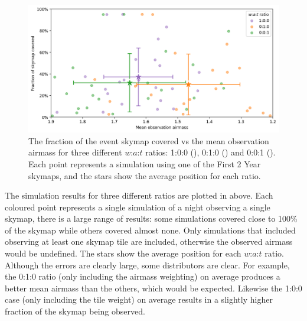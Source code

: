 \begin{colsection}
\begin{colsection}
\begin{figure}[t]
    \begin{center}
        \includegraphics[width=\linewidth]{images/sched_sim1.png}
    \end{center}
    \caption[Skymap coverage vs mean airmass for different $w$:$a$:$t$ ratios]{
        The fraction of the event skymap covered vs the mean observation airmass for three different $w$:$a$:$t$ ratios: 1:0:0 (), 0:1:0 () and 0:0:1 (). Each point represents a simulation using one of the First 2 Year skymaps, and the stars show the average position for each ratio.
    }\label{fig:scheduler_sim_results1}
\end{figure}

The simulation results for three different ratios are plotted in  above. Each coloured point represents a single simulation of a night observing a single skymap, there is a large range of  results: some simulations covered close to 100\% of the skymap while others covered almost none. Only simulations that included observing at least one skymap tile are included, otherwise the observed airmass would be undefined. The stars show the average position for each $w$:$a$:$t$ ratio. Although the errors are clearly large, some distributors are clear. For example, the 0:1:0 ratio (only including the airmass weighting) on average produces a better mean airmass than the others, which would be expected. Likewise the 1:0:0 case (only including the tile weight) on average results in a slightly higher fraction of the skymap being observed.


\end{colsection}
\end{colsection}

